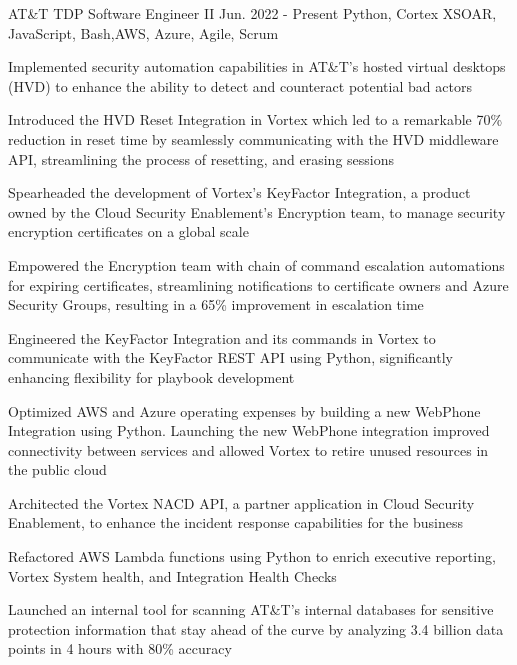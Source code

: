 
\begin{cventry}
    {AT\&T}
    {TDP Software Engineer II}
    {Jun. 2022 - Present}
    {Python, Cortex XSOAR, JavaScript, Bash,}{AWS, Azure, Agile, Scrum}
    \begin{cvitems}
        \item Implemented security automation capabilities in AT\&T’s hosted virtual desktops (HVD) to enhance the ability to detect and counteract potential bad actors
        \item Introduced the HVD Reset Integration in Vortex which led to a remarkable 70\% reduction in reset time by seamlessly communicating with the HVD middleware API, streamlining the process of resetting, and erasing sessions
        \item Spearheaded the development of Vortex’s KeyFactor Integration, a product owned by the Cloud Security Enablement’s Encryption team, to manage security encryption certificates on a global scale
        \item Empowered the Encryption team with chain of command escalation automations for expiring certificates, streamlining notifications to certificate owners and Azure Security Groups, resulting in a 65\% improvement in escalation time
        \item Engineered the KeyFactor Integration and its commands in Vortex to communicate with the KeyFactor REST API using Python, significantly enhancing flexibility for playbook development
        \item Optimized AWS and Azure operating expenses by building a new WebPhone Integration using Python. Launching the new WebPhone integration improved connectivity between services and allowed Vortex to retire unused resources in the public cloud
        \item Architected the Vortex NACD API, a partner application in Cloud Security Enablement, to enhance the incident response capabilities for the business
        \item Refactored AWS Lambda functions using Python to enrich executive reporting, Vortex System health, and Integration Health Checks
        \item Launched an internal tool for scanning AT\&T's internal databases for sensitive protection information that stay ahead of the curve by analyzing 3.4 billion data points in 4 hours with 80\% accuracy
        
    \end{cvitems}
\end{cventry}




